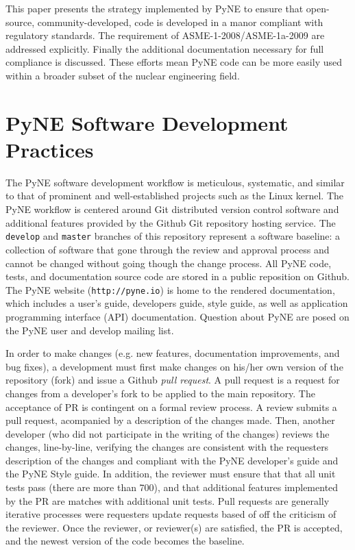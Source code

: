 \documentclass{anstrans}
\begin{document}
This paper presents the strategy implemented by PyNE to ensure that
open-source, community-developed, code is developed in a manor compliant with
regulatory standards. The requirement of ASME-1-2008/ASME-1a-2009 are addressed
explicitly. Finally the additional documentation necessary for full compliance
is discussed. These efforts mean PyNE code can be more easily used within a
broader subset of the nuclear engineering field.



\section{PyNE Software Development Practices}

The PyNE software development workflow is meticulous, systematic, and similar
to that of prominent and well-established projects such as the Linux kernel.
The PyNE workflow is centered around Git distributed version control software
and additional features provided by the Github Git repository hosting service.
The \texttt{develop} and \texttt{master} branches of this repository represent
a software baseline: a collection of software that gone through the review and
approval process and cannot be changed without going though the change process.
All PyNE code, tests, and documentation source code are stored in a public
reposition on Github. The PyNE website (\texttt{http://pyne.io}) is home to the
rendered documentation, which includes a user's guide, developers guide, style
guide, as well as application programming interface (API) documentation.
Question about PyNE are posed on the PyNE user and develop mailing list.

In order to make changes (e.g. new features, documentation improvements, and
bug fixes), a development must first make changes on his/her own version of the
repository (fork) and issue a Github \emph{pull request}. A pull request is a
request for changes from a developer's fork to be applied to the main
repository. The acceptance of PR is contingent on a formal review process. A
review submits a pull request, acompanied by a description of the changes made.
Then, another developer (who did not participate in the writing of the changes)
reviews the changes, line-by-line, verifying the changes are consistent with
the requesters description of the changes and compliant with the PyNE
developer's guide and the PyNE Style guide. In addition, the reviewer must
ensure that that all unit tests pass (there are more than 700), and that
additional features implemented by the PR are matches with additional unit
tests. Pull requests are generally iterative processes were requesters update
requests based of off the criticism of the reviewer. Once the reviewer, or
reviewer(s) are satisfied, the PR is accepted, and the newest version of the
code becomes the baseline.
\end{document}
